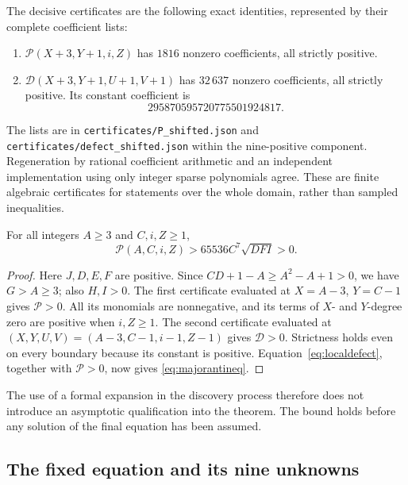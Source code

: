 The decisive certificates are the following exact identities, represented
by their complete coefficient lists:
\begin{enumerate}
 \item $\mathcal P(X+3,Y+1,i,Z)$ has $1816$ nonzero coefficients,
       all strictly positive.
 \item $\mathcal D(X+3,Y+1,U+1,V+1)$ has $32\,637$ nonzero
       coefficients, all strictly positive.  Its constant coefficient is
       \[
          295870595720775501924817.
       \]
\end{enumerate}
The lists are in \texttt{certificates/P\_shifted.json} and
\texttt{certificates/defect\_shifted.json} within the nine-positive
component.  Regeneration by rational coefficient arithmetic and an
independent implementation using only integer sparse polynomials agree.
These are finite algebraic certificates for statements over the whole
domain, rather than sampled inequalities.

\begin{lemma}
For all integers $A\geq3$ and $C,i,Z\geq1$,
\begin{equation}
 \mathcal P(A,C,i,Z)>65536C^7\sqrt{DFI}>0.
                                                    \label{eq:majorantineq}
\end{equation}
\end{lemma}
\begin{proof}
Here $J,D,E,F$ are positive.  Since
$CD+1-A\geq A^2-A+1>0$, we have $G>A\geq3$; also $H,I>0$.
The first certificate evaluated at $X=A-3$, $Y=C-1$ gives
$\mathcal P>0$.  All its monomials are nonnegative, and its terms of
$X$- and $Y$-degree zero are positive when $i,Z\geq1$.
The second certificate evaluated at
$(X,Y,U,V)=(A-3,C-1,i-1,Z-1)$ gives $\mathcal D>0$.
Strictness holds even on every boundary because its constant is positive.
Equation~\eqref{eq:localdefect}, together with $\mathcal P>0$, now gives
\eqref{eq:majorantineq}.
\end{proof}

The use of a formal expansion in the discovery process therefore does
not introduce an asymptotic qualification into the theorem.  The bound
holds before any solution of the final equation has been assumed.

\subsection{The fixed equation and its nine unknowns}

